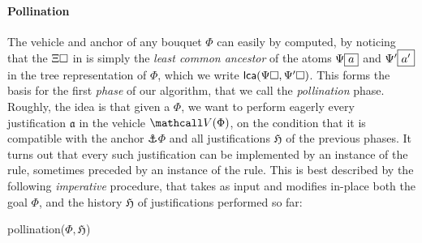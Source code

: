 \begin{scope}
\paragraph{Pollination}

The vehicle and anchor of any bouquet $\Phi$ can easily by computed, by noticing
that the  $\Xi\square$ in  is simply the \emph{least
common ancestor} of the atoms $\Psi\fbox{$a$}$ and $\Psi'\fbox{$a'$}$ in the
tree representation of $\Phi$, which we write $\mathsf{lca}(\Psi\square,\Psi'\square)$.
This forms the basis for the first \emph{phase} of our algorithm, that we call
the \emph{pollination} phase. Roughly, the idea
is that given a  $\Phi$, we want to perform eagerly every justification
$\mathfrak{a}$ in the vehicle $\vehicle{\Phi}$, on the condition that it is
compatible with the anchor $\anchor{\Phi}$ and all justifications $\mathfrak{H}$
of the previous phases. It turns out that every such justification can be
implemented by an instance of the  rule, sometimes preceded by an
instance of the  rule. This is best described by the following
\emph{imperative} procedure, that takes as input and modifies in-place both the
goal $\Phi$, and the history $\mathfrak{H}$ of justifications performed so far:

\DontPrintSemicolon

\begin{procedure}[H]
  \caption{pollination($\Phi, \mathfrak{H}$)}
  \BlankLine

\end{procedure}


\end{scope}
